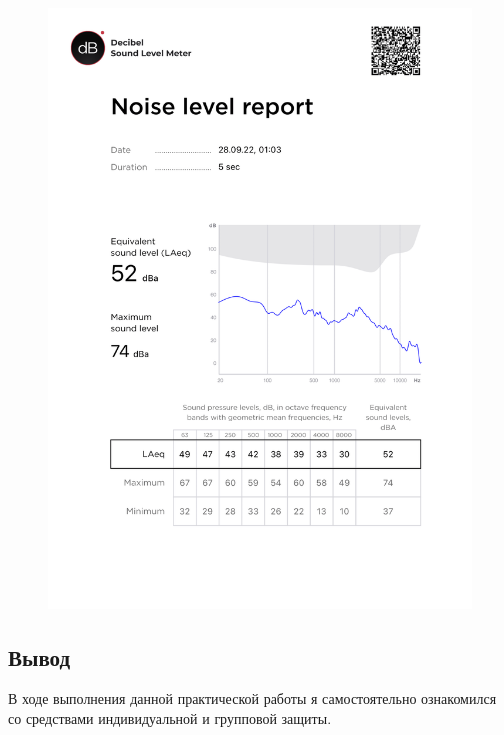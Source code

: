 \documentclass[a5paper, 12dd, twoside]{article}
\begin{document}
\begin{figure}[p]
    \centering
    \includegraphics[keepaspectratio, scale=0.6]{data/3.png}
\end{figure}

\subsection*{Вывод}
В ходе выполнения данной практической работы я самостоятельно ознакомился со средствами индивидуальной и групповой защиты.
\end{document}
